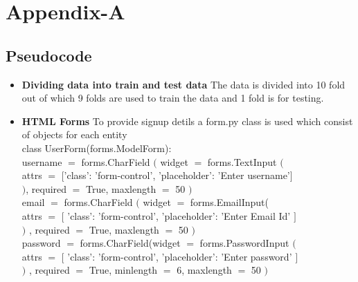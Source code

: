 \documentclass[oneside,12pt]{Classes/VTU}
\begin{document}
	\chapter*{Appendix-A}
	\section*{Pseudocode} 
	
	\begin{itemize}
		\item \textbf{Dividing data into train and test data} The data is divided into 10 fold out of which 9 folds are used to train the data and 1 fold is for testing.
		\item \textbf{HTML Forms} To provide signup detils a form.py class is used which consist of objects for each entity\\
		class UserForm(forms.ModelForm): \\
		username $=$ forms.CharField $($ widget $=$ forms.TextInput $($ \\
		attrs $=$ $[$'class': 'form-control', 'placeholder': 'Enter username'$]$ \\
		$)$, required $=$ True, maxlength $=$ 50 $)$ \\
		
		email $=$ forms.CharField $($ widget $=$ forms.EmailInput(  \\
		attrs $=$ $[$ 'class': 'form-control', 'placeholder': 'Enter Email Id' $]$  \\
		$)$ , required $=$ True, maxlength $=$ 50 $)$  \\
		
		password $=$ forms.CharField(widget $=$ forms.PasswordInput $($  \\
		attrs $=$ $[$ 'class': 'form-control', 'placeholder': 'Enter password' $]$  \\
		$)$ , required $=$ True, minlength $=$ 6, maxlength $=$ 50 $)$  \\
		

\end{itemize}
\end{document}
